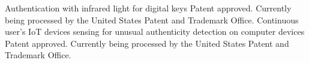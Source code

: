 %
%
%


\begin{patents}
    \patent
        {Authentication with infrared light for digital keys}
        {Patent approved. Currently being processed by the United States Patent and Trademark Office.}
        \newline
    \patent
        {Continuous user's IoT devices sensing for unusual authenticity detection on computer devices}
        {Patent approved. Currently being processed by the United States Patent and Trademark Office.}
        \newline
\end{patents}